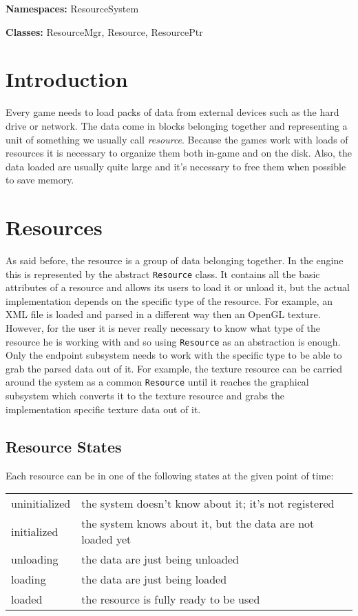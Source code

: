 \noindent\textbf{Namespaces:} ResourceSystem

\noindent\textbf{Classes:} ResourceMgr, Resource, ResourcePtr


\section{Introduction}

Every game needs to load packs of data from external devices such as the hard drive or network. The data come in blocks belonging together and representing a unit of something we usually call \emph{resource}. Because the games work with loads of resources it is necessary to organize them both in-game and on the disk. Also, the data loaded are usually quite large and it's necessary to free them when possible to save memory.


\section{Resources}
As said before, the resource is a group of data belonging together. In the engine this is represented by the abstract \verb'Resource' class. It contains all the basic attributes of a resource and allows its users to load it or unload it, but the actual implementation depends on the specific type of the resource. For example, an XML file is loaded and parsed in a different way then an OpenGL texture. However, for the user it is never really necessary to know what type of the resource he is working with and so using \verb'Resource' as an abstraction is enough. Only the endpoint subsystem needs to work with the specific type to be able to grab the parsed data out of it. For example, the texture resource can be carried around the system as a common \verb'Resource' until it reaches the graphical subsystem which converts it to the texture resource and grabs the implementation specific texture data out of it.

\subsection{Resource States}
Each resource can be in one of the following states at the given point of time:
\begin{table}[htbp]
	{\scriptsize 
	\begin{tabular}{|p{0.13\hsize}|p{0.58\hsize}|}
		\hline
		uninitialized & the system doesn't know about it; it's not registered \\
		initialized & the system knows about it, but the data are not loaded yet \\
		unloading & the data are just being unloaded \\
		loading & the data are just being loaded \\
		loaded & the resource is fully ready to be used \\
		\hline
	\end{tabular}
	}
\end{table}

